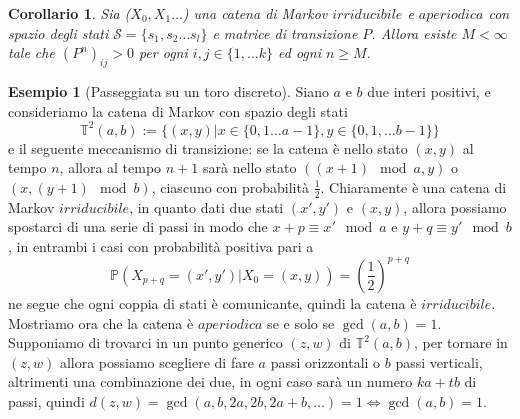\documentclass{article}
\newtheorem{corollary}[theorem]{Corollario}
\theoremstyle{definition}
\theoremstyle{definition}
\newtheorem{example}[theorem]{Esempio}
\theoremstyle{remark}
\begin{document}
\begin{corollary}
    Sia ($X_0,X_1\dots$) una catena di Markov $irriducibile$ e $aperiodica$ con spazio degli stati $\mathcal{S} =\{s_1,s_2\dots s_l\}$ e matrice di
    transizione $P$. Allora esiste $M<\infty$ tale che $(P^n)_{ij}>0$ per ogni $i,j\in\{1,\dots k\}$ ed ogni $n\ge M$.
\end{corollary}
\begin{example}[Passeggiata su un toro discreto]
    Siano $a$ e $b$ due interi positivi, e consideriamo la catena di Markov con spazio degli stati
    $$\mathbb{T}^2(a,b):=\{(x,y) | x\in \{0,1\dots a-1\}, y \in \{0,1,\dots b-1\}\}$$
    e il seguente meccanismo di transizione: se la catena è nello stato $(x,y)$ al tempo $n$, allora al tempo $n+1$ sarà nello stato $((x+1)\mod a,y)$ o $(x,(y+1) \mod b)$,
    ciascuno con probabilità $\frac{1}{2}$. Chiaramente è una catena di Markov $irriducibile$, in quanto dati due stati $(x',y')$ e  $(x,y)$,
    allora possiamo spostarci di una serie di passi  in modo che $x+p \equiv x' \mod a$ e $y+q \equiv y'\mod b$, in entrambi i casi con probabilità positiva pari a
    $$\mathbb{P}(X_{p+q} = (x',y')| X_0 = (x,y)) = \left(\frac{1}{2}\right)^{p+q} $$
    ne segue che ogni coppia di stati è comunicante, quindi la catena è $irriducibile$. Mostriamo ora che la catena è $aperiodica$ se e solo se  $\gcd(a,b) = 1$. Supponiamo
    di trovarci in un punto generico $(z,w)$ di $\mathbb{T}^2(a,b)$, per tornare in $(z,w)$ allora possiamo scegliere di fare $a$ passi orizzontali o $b$ passi verticali, altrimenti una
    combinazione dei due, in ogni caso sarà un numero $ka+tb$ di passi, quindi $d(z,w) = \gcd(a,b,2a,2b,2a+b,\dots) = 1 \iff  \gcd(a,b) = 1$.
\end{example}
\end{document}
